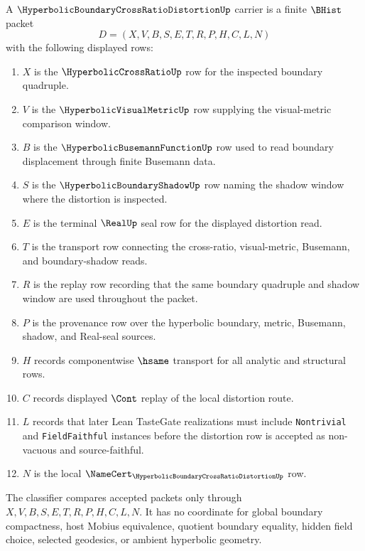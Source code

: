 \begin{definition}
\label{def:hyperbolic-boundary-cross-ratio-distortion-carrier}
A $\HyperbolicBoundaryCrossRatioDistortionUp$ carrier is a finite $\BHist$ packet
$$
D=(X,V,B,S,E,T,R,P,H,C,L,N)
$$
with the following displayed rows:
\begin{enumerate}
\item $X$ is the $\HyperbolicCrossRatioUp$ row for the inspected boundary quadruple.
\item $V$ is the $\HyperbolicVisualMetricUp$ row supplying the visual-metric comparison window.
\item $B$ is the $\HyperbolicBusemannFunctionUp$ row used to read boundary displacement through finite Busemann data.
\item $S$ is the $\HyperbolicBoundaryShadowUp$ row naming the shadow window where the distortion is inspected.
\item $E$ is the terminal $\RealUp$ seal row for the displayed distortion read.
\item $T$ is the transport row connecting the cross-ratio, visual-metric, Busemann, and boundary-shadow reads.
\item $R$ is the replay row recording that the same boundary quadruple and shadow window are used throughout the packet.
\item $P$ is the provenance row over the hyperbolic boundary, metric, Busemann, shadow, and Real-seal sources.
\item $H$ records componentwise $\hsame$ transport for all analytic and structural rows.
\item $C$ records displayed $\Cont$ replay of the local distortion route.
\item $L$ records that later Lean TasteGate realizations must include \texttt{Nontrivial} and \texttt{FieldFaithful} instances before the distortion row is accepted as non-vacuous and source-faithful.
\item $N$ is the local $\NameCert_{\HyperbolicBoundaryCrossRatioDistortionUp}$ row.
\end{enumerate}
The classifier compares accepted packets only through $X,V,B,S,E,T,R,P,H,C,L,N$. It has no coordinate for global boundary compactness, host Mobius equivalence, quotient boundary equality, hidden field choice, selected geodesics, or ambient hyperbolic geometry.
\end{definition}

